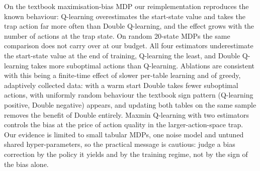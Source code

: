On the textbook maximisation-bias MDP our reimplementation reproduces the known behaviour: Q-learning overestimates the start-state value and takes the trap action far more often than Double Q-learning, and the effect grows with the number of actions at the trap state. On random 20-state MDPs the same comparison does not carry over at our budget. All four estimators underestimate the start-state value at the end of training, Q-learning the least, and Double Q-learning takes more suboptimal actions than Q-learning. Ablations are consistent with this being a finite-time effect of slower per-table learning and of greedy, adaptively collected data: with a warm start Double takes fewer suboptimal actions, with uniformly random behaviour the textbook sign pattern (Q-learning positive, Double negative) appears, and updating both tables on the same sample removes the benefit of Double entirely. Maxmin Q-learning with two estimators controls the bias at the price of action quality in the larger-action-space trap. Our evidence is limited to small tabular MDPs, one noise model and untuned shared hyper-parameters, so the practical message is cautious: judge a bias correction by the policy it yields and by the training regime, not by the sign of the bias alone.
